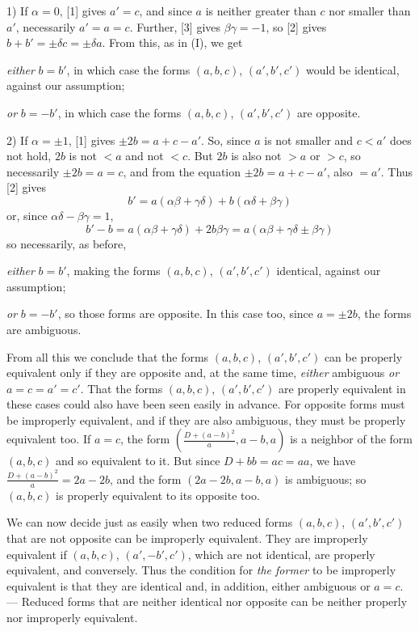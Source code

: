 1) If $\alpha=0$, [1] gives $a'=c$, and since $a$ is neither greater than $c$ nor smaller than $a'$, necessarily $a'=a=c$. Further, [3] gives $\beta\gamma=-1$, so [2] gives $b+b'=\pm\delta c=\pm\delta a$. From this, as in (I), we get

\emph{either} $b=b'$, in which case the forms $(a,b,c)$, $(a',b',c')$ would be identical, against our assumption;

\emph{or} $b=-b'$, in which case the forms $(a,b,c)$, $(a',b',c')$ are opposite.

2) If $\alpha=\pm1$, [1] gives $\pm2b=a+c-a'$. So, since $a$ is not smaller and $c<a'$ does not hold, $2b$ is not $<a$ and not $<c$. But $2b$ is also not $>a$ or $>c$, so necessarily $\pm2b=a=c$, and from the equation $\pm2b=a+c-a'$, also $=a'$. Thus [2] gives
\[
b'=a(\alpha\beta+\gamma\delta)+b(\alpha\delta+\beta\gamma)
\]
or, since $\alpha\delta-\beta\gamma=1$,
\[
b'-b=a(\alpha\beta+\gamma\delta)+2b\beta\gamma=a(\alpha\beta+\gamma\delta\pm\beta\gamma)
\]
so necessarily, as before,

\emph{either} $b=b'$, making the forms $(a,b,c)$, $(a',b',c')$ identical, against our assumption;

\emph{or} $b=-b'$, so those forms are opposite. In this case too, since $a=\pm2b$, the forms are ambiguous.

From all this we conclude that the forms $(a,b,c)$, $(a',b',c')$ can be properly equivalent only if they are opposite and, at the same time, \emph{either} ambiguous \emph{or} $a=c=a'=c'$.
That the forms $(a,b,c)$, $(a',b',c')$ are properly equivalent in these cases could also have been seen easily in advance. For opposite forms must be improperly equivalent, and if they are also ambiguous, they must be properly equivalent too. If $a=c$, the form $(\frac{D+(a-b)^2}{a},a-b,a)$ is a neighbor of the form $(a,b,c)$ and so equivalent to it. But since $D+bb=ac=aa$, we have $\frac{D+(a-b)^2}{a}=2a-2b$, and the form $(2a-2b,a-b,a)$ is ambiguous; so $(a,b,c)$ is properly equivalent to its opposite too.

We can now decide just as easily when two reduced forms $(a,b,c)$, $(a',b',c')$ that are not opposite can be improperly equivalent. They are improperly equivalent if $(a,b,c)$, $(a',-b',c')$, which are not identical, are properly equivalent, and conversely. Thus the condition for \emph{the former} to be improperly equivalent is that they are identical and, in addition, either ambiguous or $a=c$. --- Reduced forms that are neither identical nor opposite can be neither properly nor improperly equivalent.


